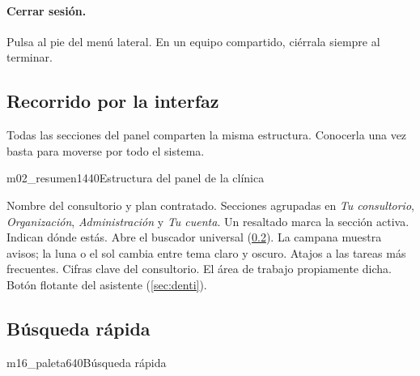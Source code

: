 \documentclass[11pt]{article}
\begin{document}
\paragraph{Cerrar sesión.} Pulsa  al pie del menú lateral. En un equipo compartido, ciérrala siempre al terminar.

\needspace{0.55\textheight}
\subsection{Recorrido por la interfaz}\label{sec:interfaz}

Todas las secciones del panel comparten la misma estructura. Conocerla una vez basta para moverse por todo el sistema.

\begin{pantalla}{m02_resumen}{1440}{Estructura del panel de la clínica}
\end{pantalla}

\begin{leyenda}
   Nombre del consultorio y plan contratado.
   Secciones agrupadas en \emph{Tu consultorio}, \emph{Organización}, \emph{Administración} y \emph{Tu cuenta}. Un resaltado marca la sección activa.
   Indican dónde estás.
   Abre el buscador universal (\cref{sec:busqueda}).
   La campana muestra avisos; la luna o el sol cambia entre tema claro y oscuro.
   Atajos a las tareas más frecuentes.
   Cifras clave del consultorio.
   El área de trabajo propiamente dicha.
   Botón flotante del asistente (\cref{sec:denti}).
\end{leyenda}

\needspace{0.55\textheight}
\subsection{Búsqueda rápida}\label{sec:busqueda}

\begin{pantalla}[0.62\linewidth]{m16_paleta}{640}{Búsqueda rápida}
\end{pantalla}
\end{document}
